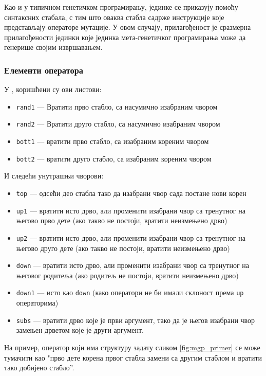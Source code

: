 \documentclass[a4paper]{article}
\begin{document}
Као и у типичном генетичком програмирању, јединке се приказују помоћу синтаксних стабала, с тим што оваква стабла садрже инструкције које представљају операторе мутације. У овом случају, прилагођеност је сразмерна прилагођености јединки које јединка мета-генетичког програмирања може да генерише својим извршавањем. 


\subsubsection{Елементи оператора}
У \cite{edmonds2001meta}, коришћени су ови листови:
\begin{itemize}
\item \texttt{rand1} — Вратити прво стабло, са насумично изабраним чвором
\item \texttt{rand2} — Вратити друго стабло, са насумично изабраним чвором
\item \texttt{bott1} — вратити прво стабло, са изабраним кореним чвором
\item \texttt{bott2} — вратити друго стабло, са изабраним кореним чвором
\end{itemize}

И следећи унутрашњи чворови:

\begin{itemize}
\item \texttt{top} — одсећи део стабла тако да изабрани чвор сада постане нови корен
\item \texttt{up1} — вратити исто дрво, али променити изабрани чвор са тренутног на његово прво дете (ако такво не постоји, вратити неизмењено дрво)
\item \texttt{up2} — вратити исто дрво, али променити изабрани чвор са тренутног на његово друго дете (ако такво не постоји, вратити неизмењено дрво)
\item \texttt{down} — вратити исто дрво, али променити изабрани чвор са тренутног на његовог родитеља (ако родитељ не постоји, вратити неизмењено дрво) 
\item \texttt{down1} — исто као \texttt{down} (како оператори не би имали склоност према \texttt{up} операторима)
\item \texttt{subs} — вратити дрво које је први аргумент, тако да је његов изабрани чвор замењен дрветом које је други аргумент.
\end{itemize}

На пример, оператор који има структуру задату сликом \ref{fig:mgp_primer} се може тумачити као "прво дете корена првог стабла замени са другим стаблом и вратити тако добијено стабло''.
\end{document}

